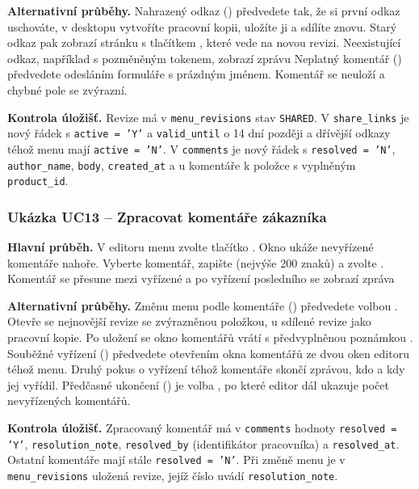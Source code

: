 \textbf{Alternativní průběhy.} Nahrazený odkaz () předvedete tak, že si první odkaz uschováte, v desktopu vytvoříte pracovní kopii, uložíte ji a sdílíte znovu. Starý odkaz pak zobrazí stránku  s tlačítkem , které vede na novou revizi. Neexistující odkaz, například s pozměněným tokenem, zobrazí zprávu  Neplatný komentář () předvedete odesláním formuláře s prázdným jménem. Komentář se neuloží a chybné pole se zvýrazní.

\textbf{Kontrola úložišť.} Revize má v \texttt{menu\_revisions} stav \texttt{SHARED}. V \texttt{share\_links} je nový řádek s \texttt{active = 'Y'} a \texttt{valid\_until} o 14 dní později a dřívější odkazy téhož menu mají \texttt{active = 'N'}. V \texttt{comments} je nový řádek s \texttt{resolved = 'N'}, \texttt{author\_name}, \texttt{body}, \texttt{created\_at} a u komentáře k položce s vyplněným \texttt{product\_id}.

\subsubsection{Ukázka UC13 -- Zpracovat komentáře zákazníka}

\textbf{Hlavní průběh.} V editoru menu  zvolte tlačítko . Okno  ukáže nevyřízené komentáře nahoře. Vyberte komentář, zapište  (nejvýše 200 znaků) a zvolte . Komentář se přesune mezi vyřízené a po vyřízení posledního se zobrazí zpráva 

\textbf{Alternativní průběhy.} Změnu menu podle komentáře () předvedete volbou . Otevře se nejnovější revize se zvýrazněnou položkou, u sdílené revize jako pracovní kopie. Po uložení se okno komentářů vrátí s předvyplněnou poznámkou . Souběžné vyřízení () předvedete otevřením okna komentářů ze dvou oken editoru téhož menu. Druhý pokus o vyřízení téhož komentáře skončí zprávou, kdo a kdy jej vyřídil. Předčasné ukončení () je volba , po které editor dál ukazuje počet nevyřízených komentářů.

\textbf{Kontrola úložišť.} Zpracovaný komentář má v \texttt{comments} hodnoty \texttt{resolved = 'Y'}, \texttt{resolution\_note}, \texttt{resolved\_by} (identifikátor pracovníka) a \texttt{resolved\_at}. Ostatní komentáře mají stále \texttt{resolved = 'N'}. Při změně menu je v \texttt{menu\_revisions} uložená revize, jejíž číslo uvádí \texttt{resolution\_note}.

